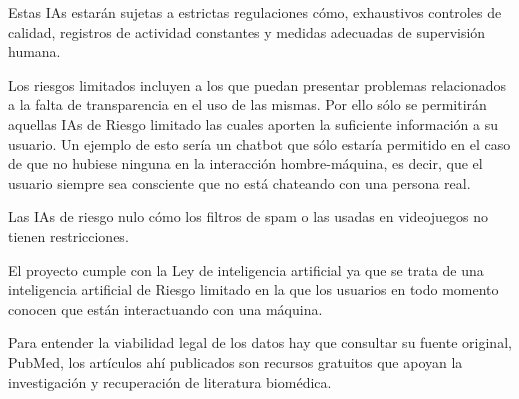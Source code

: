 Estas IAs estarán sujetas a estrictas regulaciones cómo, exhaustivos controles de calidad, registros de actividad constantes y medidas adecuadas de supervisión humana.

Los riesgos limitados incluyen a los que puedan presentar problemas relacionados a la falta de transparencia en el uso de las mismas. Por ello sólo se permitirán aquellas IAs de Riesgo limitado las cuales aporten la suficiente información a su usuario.
Un ejemplo de esto sería un chatbot que sólo estaría permitido en el caso de que no hubiese ninguna en la interacción hombre-máquina, es decir, que el usuario siempre sea consciente que no está chateando con una persona real.

Las IAs de riesgo nulo cómo los filtros de spam o las usadas en videojuegos no tienen restricciones.

El proyecto cumple con la Ley de inteligencia artificial ya que se trata de una inteligencia artificial de Riesgo limitado en la que los usuarios en todo momento conocen que están interactuando con una máquina.\cite{CE_ley_2024} 

Para entender la viabilidad legal de los datos hay que consultar su fuente original, PubMed, los artículos ahí publicados son recursos gratuitos que apoyan la investigación y recuperación de literatura biomédica.\cite{Anandhu_H_abstracts_2023}

